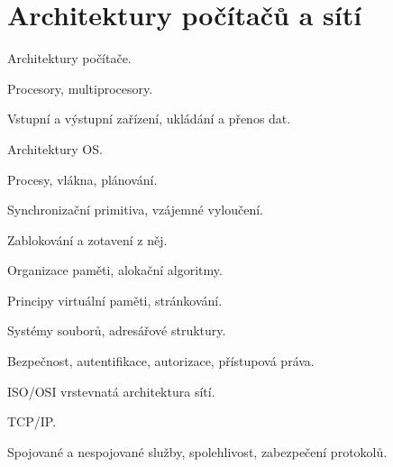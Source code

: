\section{Architektury počítačů a sítí}
\begin{pozadavky}
\begin{pitemize}
\item Architektury počítače.
\item Procesory, multiprocesory.
\item Vstupní a výstupní zařízení, ukládání a přenos dat.
\item Architektury OS.
\item Procesy, vlákna, plánování.
\item Synchronizační primitiva, vzájemné vyloučení.
\item Zablokování a zotavení z něj.
\item Organizace paměti, alokační algoritmy.
\item Principy virtuální paměti, stránkování.
\item Systémy souborů, adresářové struktury.
\item Bezpečnost, autentifikace, autorizace, přístupová práva.
\item ISO/OSI vrstevnatá architektura sítí.
\item TCP/IP.
\item Spojované a nespojované služby, spolehlivost, zabezpečení protokolů.
\end{pitemize}
\end{pozadavky}















